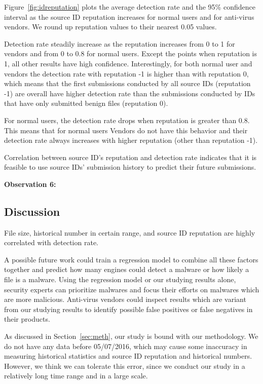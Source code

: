 Figure~\ref{fig:idreputation} plots the average detection rate and the 95\% confidence interval 
as the source ID reputation increases for normal users and for anti-virus vendors.
We round up reputation values to their nearest 0.05 values. 

Detection rate steadily increase as the reputation increases from 0 to 1 for vendors and from 0 to 0.8 for normal users.
Except the points when reputation is 1, all other results have high confidence.
Interestingly, for both normal user and vendors the detection rate with reputation -1 is higher than with reputation 0,
which means that the first submissions conducted by all source IDs (reputation -1) 
are overall have higher detection rate than 
the submissions conducted by IDs that have only submitted benign files (reputation 0).

For normal users, the detection rate drops when reputation is greater than 0.8.
This means that for normal users  %
Vendors do not have this behavior and their detection rate always increases with higher reputation (other than reputation -1).

Correlation between source ID's reputation and detection rate indicates 
that it is feasible to use source IDs' submission history to predict their future submissions.

{\bf Observation 6:} 
{\em }

\subsection{Discussion}

File size, historical number in certain range, and source ID reputation
are highly correlated with detection rate. 

A possible future work could train a regression model to combine all these factors together and 
predict how many engines could detect a malware or how likely a file is a malware. 
Using the regression model or our studying results alone, 
security experts can prioritize malwares and focus their efforts on malwares which are more malicious. 
Anti-virus vendors could inspect results which are variant from our studying results 
to identify possible false positives or false negatives in their products. 

As discussed in Section~\ref{sec:meth}, our study is bound with our methodology.
We do not have any data before 05/07/2016, 
which may cause some inaccuracy in measuring historical statistics and 
source ID reputation and historical numbers.
However, we think we can tolerate this error, 
since we conduct our study in a relatively long time range and in a large scale. 
